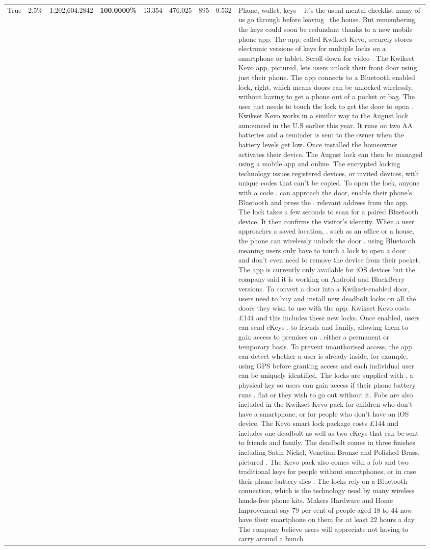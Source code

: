 \begin{table}[H]
\begin{tabular}{lllrlllll}
True & 2.5\% & 1,202,604.2842 & \bfseries \color{red} 100.0000\% & 13.354 & 476.025 & 895 & 0.532 & Phone, wallet, keys – it’s the usual mental checklist many of us go through before leaving  the house. But remembering the keys could soon be redundant thanks to a new mobile phone app. The app, called Kwikset Kevo, securely stores electronic versions of keys for multiple locks on a smartphone or tablet. Scroll down for video . The Kwikset Kevo app, pictured, lets users unlock their front door using just their phone. The app connects to a Bluetooth enabled lock, right, which means doors can be unlocked wirelessly, without having to get a phone out of a pocket or bag. The user just needs to touch the lock to get the door to open . Kwikset Kevo works in a similar way to the August lock announced in the U.S earlier this year. It runs on two AA batteries and a reminder is sent to the owner when the battery levels get low. Once installed the homeowner activates their device. The August lock can then be managed using a mobile app and online. The encrypted locking technology issues registered devices, or invited devices, with unique codes that can't be copied. To open the lock, anyone with a code . can approach the door, enable their phone's Bluetooth and press the . relevant address from the app. The lock takes a few seconds to scan for a paired Bluetooth device. It then confirms the visitor's identity. When a user approaches a saved location, . such as an office or a house, the phone can wirelessly unlock the door . using Bluetooth meaning users only have to touch a lock to open a door . and don't even need to remove the device from their pocket. The app is currently only available for iOS devices but the company said it is working on Android and BlackBerry versions. To convert a door into a Kwikset-enabled door, users need to buy and install new deadbolt locks on all the doors they wish to use with the app. Kwikset Kevo costs £144 and this includes these new locks. Once enabled, users can send eKeys . to friends and family, allowing them to gain access to premises on . either a permanent or temporary basis. To prevent unauthorised access, the app can detect whether a user is already inside, for example, using GPS before granting access and each individual user can be uniquely identified. The locks are supplied with . a physical key so users can gain access if their phone battery runs . flat or they wish to go out without it. Fobs are also included in the Kwikset Kevo pack for children who don't have a smartphone, or for people who don't have an iOS device. The Kevo smart lock package costs £144 and includes one deadbolt as well as two eKeys that can be sent to friends and family. The deadbolt comes in three finishes including Satin Nickel, Venetian Bronze and Polished Brass, pictured . The Kevo pack also comes with a fob and two traditional keys for people without smartphones, or in case their phone battery dies . The locks rely on a Bluetooth connection, which is the technology used by many wireless hands-free phone kits. Makers Hardware and Home Improvement say 79 per cent of people aged 18 to 44 now have their smartphone on them for at least 22 hours a day. The company believe users will appreciate not having to carry around a bunch 
\end{tabular}
\end{table}
